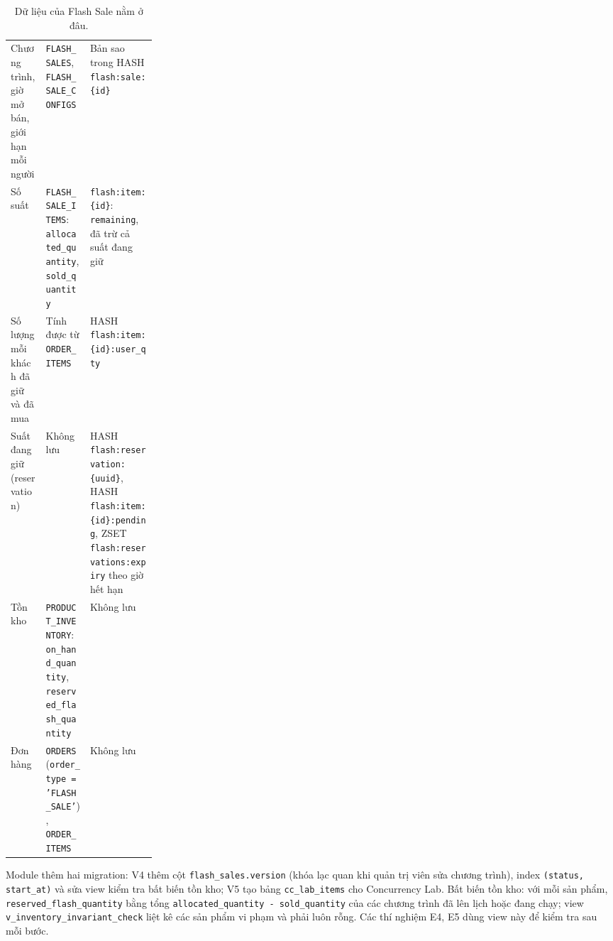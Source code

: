 \begin{table}[!htbp]
\centering
\caption{Dữ liệu của Flash Sale nằm ở đâu.}\label{tab:cc-chia-du-lieu}
\reporttablesetup
\begin{tabularx}{\linewidth}{|P{0.24\linewidth}|L|L|}
\hline
{}
 &  &  \\ \hline
Chương trình, giờ mở bán, giới hạn mỗi người & \texttt{FLASH\_\allowbreak SALES}, \texttt{FLASH\_\allowbreak SALE\_\allowbreak CONFIGS} & Bản sao trong HASH \texttt{flash:\allowbreak sale:\allowbreak \{id\}} \\ \hline
Số suất & \texttt{FLASH\_\allowbreak SALE\_\allowbreak ITEMS}: \texttt{allocated\_\allowbreak quantity}, \texttt{sold\_\allowbreak quantity} & \texttt{flash:\allowbreak item:\allowbreak \{id\}}: \texttt{remaining}, đã trừ cả suất đang giữ \\ \hline
Số lượng mỗi khách đã giữ và đã mua & Tính được từ \texttt{ORDER\_\allowbreak ITEMS} & HASH \texttt{flash:\allowbreak item:\allowbreak \{id\}:\allowbreak user\_qty} \\ \hline
Suất đang giữ (reservation) & Không lưu & HASH \texttt{flash:\allowbreak reservation:\allowbreak \{uuid\}}, HASH \texttt{flash:\allowbreak item:\allowbreak \{id\}:\allowbreak pending}, ZSET \texttt{flash:\allowbreak reservations:\allowbreak expiry} theo giờ hết hạn \\ \hline
Tồn kho & \texttt{PRODUCT\_\allowbreak INVENTORY}: \texttt{on\_\allowbreak hand\_\allowbreak quantity}, \texttt{reserved\_\allowbreak flash\_\allowbreak quantity} & Không lưu \\ \hline
Đơn hàng & \texttt{ORDERS} (\texttt{order\_\allowbreak type = 'FLASH\_\allowbreak SALE'}), \texttt{ORDER\_\allowbreak ITEMS} & Không lưu \\ \hline
\end{tabularx}
\end{table}

Module thêm hai migration: V4 thêm cột \texttt{flash\_\allowbreak sales.version} (khóa lạc quan khi quản trị viên sửa chương trình), index \texttt{(status, start\_\allowbreak at)} và sửa view kiểm tra bất biến tồn kho; V5 tạo bảng \texttt{cc\_\allowbreak lab\_\allowbreak items} cho Concurrency Lab. Bất biến tồn kho: với mỗi sản phẩm, \texttt{reserved\_\allowbreak flash\_\allowbreak quantity} bằng tổng \texttt{allocated\_\allowbreak quantity - sold\_\allowbreak quantity} của các chương trình đã lên lịch hoặc đang chạy; view \texttt{v\_\allowbreak inventory\_\allowbreak invariant\_\allowbreak check} liệt kê các sản phẩm vi phạm và phải luôn rỗng. Các thí nghiệm E4, E5 dùng view này để kiểm tra sau mỗi bước.

